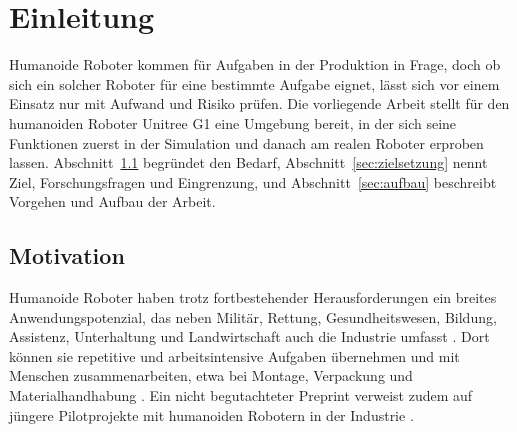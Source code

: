 \chapter{Einleitung}
\label{chap:einleitung}
Humanoide Roboter kommen für Aufgaben in der Produktion in Frage, doch ob sich ein solcher Roboter für eine bestimmte Aufgabe eignet, lässt sich vor einem Einsatz nur mit Aufwand und Risiko prüfen.
Die vorliegende Arbeit stellt für den humanoiden Roboter Unitree G1 eine Umgebung bereit, in der sich seine Funktionen zuerst in der Simulation und danach am realen Roboter erproben lassen.
Abschnitt~\ref{sec:motivation} begründet den Bedarf, Abschnitt~\ref{sec:zielsetzung} nennt Ziel, Forschungsfragen und Eingrenzung, und Abschnitt~\ref{sec:aufbau} beschreibt Vorgehen und Aufbau der Arbeit.

\section{Motivation}
\label{sec:motivation}
Humanoide Roboter haben trotz fortbestehender Herausforderungen ein breites Anwendungspotenzial, das neben Militär, Rettung, Gesundheitswesen, Bildung, Assistenz, Unterhaltung und Landwirtschaft auch die Industrie umfasst \cite{Tong2024}.
Dort können sie repetitive und arbeitsintensive Aufgaben übernehmen und mit Menschen zusammenarbeiten, etwa bei Montage, Verpackung und Materialhandhabung \cite{Tong2024}.
Ein nicht begutachteter Preprint verweist zudem auf jüngere Pilotprojekte mit humanoiden Robotern in der Industrie \cite{Ding2026}.

